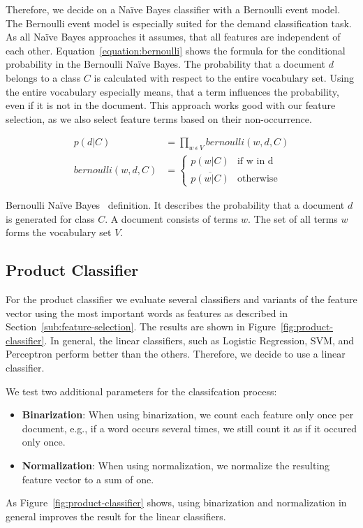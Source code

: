 Therefore, we decide on a Na\"{i}ve Bayes classifier with a Bernoulli event model.
The Bernoulli event model is especially suited for the demand classification task.
As all Na\"{i}ve Bayes approaches it assumes, that all features are independent of each other.
Equation~\ref{equation:bernoulli} shows the formula for the conditional probability in the Bernoulli Na\"{i}ve Bayes.
The probability that a document $d$ belongs to a class $C$ is calculated with respect to the entire vocabulary set.
Using the entire vocabulary especially means, that a term influences the probability, even if it is not in the document.
This approach works good with our feature selection, as we also select feature terms based on their non-occurrence.

\captionsetup{singlelinecheck=off}
\begin{equationBlock}
\begin{align*}
	p(d|C) &= \prod_{w~\epsilon~V} bernoulli(w, d, C) \\
	bernoulli(w, d, C) &=
	\begin{cases}
		p(w|C) 					&\text{if w in d}\\
		\overline{p(w|C)} 		&\text{otherwise}
	\end{cases}
	\end{align*}
	\caption{
		Bernoulli Na\"{i}ve Bayes~\cite{mccallum1998comparison} definition.
		It describes the probability that a document $d$ is generated for class $C$.
		A document consists of terms $w$.
		The set of all terms $w$ forms the vocabulary set $V$.
	}
	\label{equation:bernoulli}
\end{equationBlock}

\subsection{Product Classifier}
For the product classifier we evaluate several classifiers and variants of the feature vector using the most important words as features as described in Section~\ref{sub:feature-selection}.
The results are shown in Figure~\ref{fig:product-classifier}.
In general, the linear classifiers, such as Logistic Regression, SVM, and Perceptron perform better than the others.
Therefore, we decide to use a linear classifier.

We test two additional parameters for the classifcation process:
\begin{itemize}
	\item
		\textbf{Binarization}:
			When using binarization, we count each feature only once per document, e.g., if a word occurs several times, we still count it as if it occured only once.
	\item
		\textbf{Normalization}:
			When using normalization, we normalize the resulting feature vector to a sum of one.
\end{itemize}
As Figure~\ref{fig:product-classifier} shows, using binarization and normalization in general improves the result for the linear classifiers.


